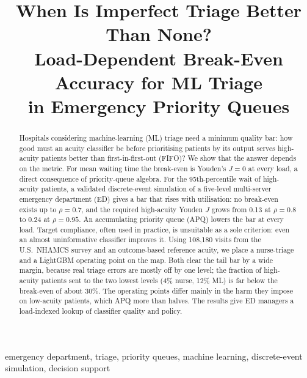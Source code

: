 \documentclass[conference]{IEEEtran}
\newcommand{\todo}[1]{\textcolor{red}{[TODO: #1]}}
\begin{document}
\title{When Is Imperfect Triage Better Than None?\\
Load-Dependent Break-Even Accuracy for ML Triage\\ in Emergency Priority Queues}

\author{
\IEEEauthorblockA{\todo{Department, Institution}\\
\todo{City, Country}\\
sisodiya.tanishq.singh@gmail.com}}

\maketitle

\begin{abstract}
Hospitals considering machine-learning (ML) triage need a minimum quality bar:
how good must an acuity classifier be before prioritising patients by its output
serves high-acuity patients better than first-in-first-out (FIFO)? We show that the
answer depends on the metric. For mean waiting time the break-even is Youden's
$J=0$ at every load, a direct consequence of priority-queue algebra. For the
95th-percentile wait of high-acuity patients, a validated discrete-event simulation
of a five-level multi-server emergency department (ED) gives a bar that rises
with utilisation: no break-even exists up to $\rho=0.7$, and the required high-acuity
Youden $J$ grows from 0.13 at $\rho=0.8$ to 0.24 at $\rho=0.95$. An accumulating
priority queue (APQ) lowers the bar at every load. Target compliance, often
used in practice, is unsuitable as a sole criterion: even an almost uninformative
classifier improves it. Using 108,180 visits from the U.S.\ NHAMCS survey and an
outcome-based reference acuity, we place a nurse-triage and a LightGBM operating point
on the map. Both clear the tail bar by a wide margin, because real triage errors are
mostly off by one level; the fraction of high-acuity patients sent to the two lowest
levels (4\% nurse, 12\% ML) is far below the break-even of about 30\%. The operating
points differ mainly in the harm they impose on low-acuity patients, which APQ
more than halves. The results give ED managers a load-indexed lookup of classifier
quality and policy.
\end{abstract}

\begin{IEEEkeywords}
emergency department, triage, priority queues, machine learning, discrete-event simulation,
decision support
\end{IEEEkeywords}
\end{document}
